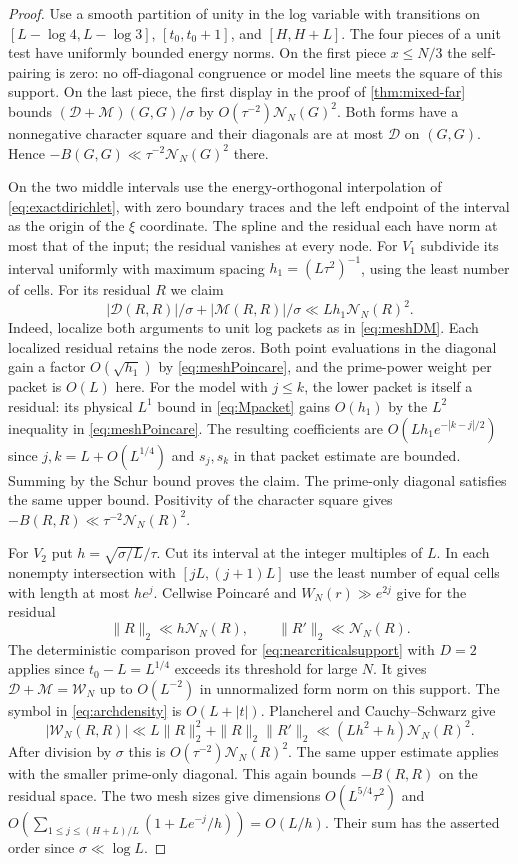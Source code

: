 \documentclass[11pt,a4paper]{article}
\numberwithin{equation}{section}
\newcommand{\NN}{\mathcal N_N}
\begin{document}
\begin{proof}
Use a smooth partition of unity in the log variable with
transitions on $[L-\log4,L-\log3]$, $[t_0,t_0+1]$, and
$[H,H+L]$. The four pieces of a unit test have uniformly
bounded energy norms. On the first piece $x\le N/3$ the
self-pairing is zero: no off-diagonal congruence or model line
meets the square of this support. On the last piece, the first
display in the proof of \cref{thm:mixed-far} bounds
$(\mathcal D+\mathcal M)(G,G)/\sigma$ by
$O(\tau^{-2})\NN(G)^2$. Both forms have a nonnegative character
square and their diagonals are at most $\mathcal D$ on $(G,G)$.
Hence $-B(G,G)\ll\tau^{-2}\NN(G)^2$ there.

On the two middle intervals use the energy-orthogonal interpolation
of \cref{eq:exactdirichlet}, with zero boundary traces and the
left endpoint of the interval as the origin of the $\xi$ coordinate.
The spline and the residual each have norm at most that of the
input; the residual vanishes at every node. For $V_1$ subdivide
its interval uniformly with maximum spacing
$h_1=(L\tau^2)^{-1}$, using the least number of cells. For its
residual $R$ we claim
\[
 |\mathcal D(R,R)|/\sigma+|\mathcal M(R,R)|/\sigma
 \ll Lh_1\NN(R)^2 .
\]
Indeed, localize both arguments to unit log packets as in
\cref{eq:meshDM}. Each localized residual retains the node
zeros. Both point evaluations in the diagonal gain a factor
$O(\sqrt{h_1})$ by \cref{eq:meshPoincare}, and the prime-power
weight per packet is $O(L)$ here. For the model with $j\le k$,
the lower packet is itself a residual: its physical $L^1$ bound
in \cref{eq:Mpacket} gains $O(h_1)$ by the $L^2$ inequality in
\cref{eq:meshPoincare}. The resulting coefficients are
$O(Lh_1 e^{-|k-j|/2})$ since $j,k=L+O(L^{1/4})$ and $s_j,s_k$
in that packet estimate are bounded. Summing by the Schur bound
proves the claim. The prime-only diagonal satisfies the same
upper bound. Positivity of the character square gives
$-B(R,R)\ll\tau^{-2}\NN(R)^2$.

For $V_2$ put $h=\sqrt{\sigma/L}/\tau$. Cut its interval at
the integer multiples of $L$. In each nonempty intersection
with $[jL,(j+1)L]$ use the least number of equal cells with
length at most $he^j$. Cellwise Poincar\'e and
$W_N(r)\gg e^{2j}$ give for the residual
\[
 \|R\|_2\ll h\NN(R),\qquad \|R'\|_2\ll\NN(R).
\]
The deterministic comparison proved for \cref{eq:nearcriticalsupport}
with $D=2$ applies since $t_0-L=L^{1/4}$ exceeds its threshold
for large $N$. It gives $\mathcal D+\mathcal M=\mathcal W_N$
up to $O(L^{-2})$ in unnormalized form norm on this support.
The symbol in \cref{eq:archdensity} is $O(L+|t|)$.
Plancherel and Cauchy--Schwarz give
\[
 |\mathcal W_N(R,R)|\ll L\|R\|_2^2+\|R\|_2\|R'\|_2
      \ll (Lh^2+h)\NN(R)^2 .
\]
After division by $\sigma$ this is $O(\tau^{-2})\NN(R)^2$.
The same upper estimate applies with the smaller prime-only
diagonal. This again bounds $-B(R,R)$ on the residual space.
The two mesh sizes give dimensions $O(L^{5/4}\tau^2)$ and
$O(\sum_{1\le j\le (H+L)/L}(1+Le^{-j}/h))=O(L/h)$.
Their sum has the asserted order since $\sigma\ll\log L$.


\end{proof}
\end{document}
